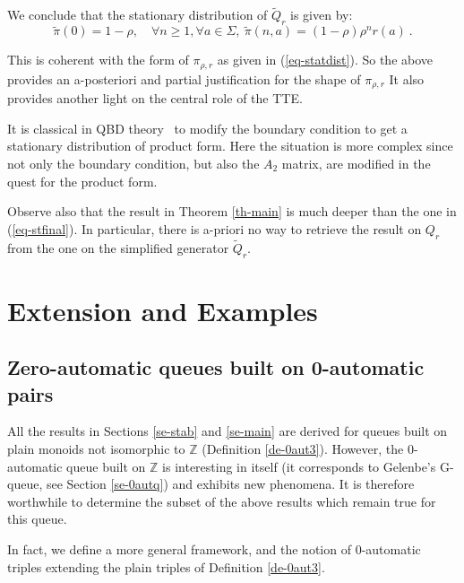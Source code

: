 \documentclass[11pt,a4paper]{article}
\theoremstyle{remark}
\def\Blackboardfont{\mathbb}
\def\Z{{\Blackboardfont Z}}
\def\eref#1{(\ref{#1})}
\begin{document}
We conclude that the stationary distribution of
$\widetilde{Q}_r$ is given by:
\begin{equation}\label{eq-stfinal}
 \widetilde{\pi}(0) = 1-\rho, \quad \forall n\geq 1, \forall a\in
 \Sigma, \ \widetilde{\pi}(n,a)=(1-\rho)\rho^n r(a) \:.
\end{equation}

This is coherent with the form of $\pi_{\rho,r}$ as given in
\eref{eq-statdist}.
So the above provides an a-posteriori and partial justification for the shape of $\pi_{\rho,r}$
It also provides another light on the central role of the TTE.

It is classical in QBD theory~\cite{LaRa,DaQu} to modify the boundary condition to
get a stationary distribution of product form. Here the situation is
more complex since not only the
boundary condition, but also the $A_2$ matrix, are modified in the
quest for the product form.

Observe also that the result in Theorem \ref{th-main} is
much deeper than the one in \eref{eq-stfinal}. In particular, there
is a-priori no way to retrieve the result on $Q_r$ from the one on the
simplified generator $\widetilde{Q}_r$.




\section{Extension and Examples}\label{se-examples}

\subsection{Zero-automatic queues built on 0-automatic pairs}\label{sse-G}

All the results in Sections \ref{se-stab} and \ref{se-main} are
derived for queues built on plain monoids not isomorphic to $\Z$ 
(Definition \ref{de-0aut3}). 
However, the 0-automatic queue built on $\Z$ is interesting in itself
(it corresponds to Gelenbe's G-queue, see Section \ref{se-0autq}) and
exhibits new phenomena. It is therefore worthwhile to determine the subset of the above
results which remain true for this queue. 

In fact, we define a more general framework, and the notion of
0-automatic triples extending the plain triples of Definition
\ref{de-0aut3}. 

\medskip
\end{document}
